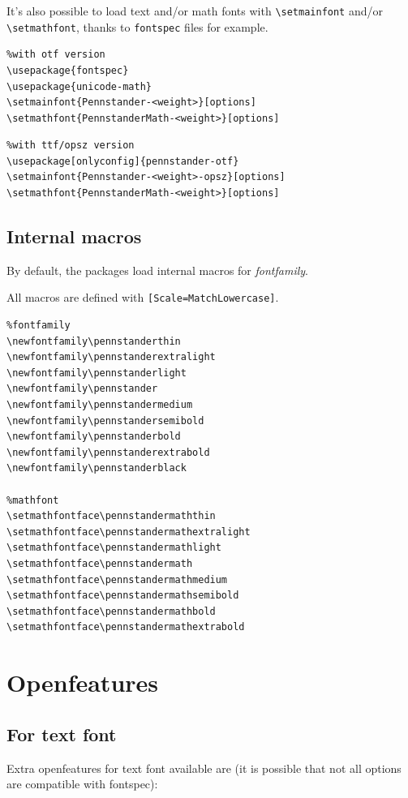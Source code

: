 \documentclass[a4paper]{scrartcl}
\newcommand*{\opt}[1]{\texttt{#1}}
\newcommand*{\cmd}[1]{\texttt{\textbackslash #1}}\newcommand*{\showtchar}[1]{\cmd{#1}~\csname #1\endcsname}
\begin{document}
It's also possible to load text and/or math fonts with \cmd{setmainfont} and/or \cmd{setmathfont}, thanks to \opt{fontspec} files for example.

\begin{verbatim}
%with otf version
\usepackage{fontspec}
\usepackage{unicode-math}
\setmainfont{Pennstander-<weight>}[options]
\setmathfont{PennstanderMath-<weight>}[options]
\end{verbatim}

\begin{verbatim}
%with ttf/opsz version
\usepackage[onlyconfig]{pennstander-otf}
\setmainfont{Pennstander-<weight>-opsz}[options]
\setmathfont{PennstanderMath-<weight>}[options]
\end{verbatim}

\subsection{Internal macros}

By default, the packages load internal macros for \textit{fontfamily}.

All macros are defined with \opt{[Scale=MatchLowercase]}.

\begin{verbatim}
%fontfamily
\newfontfamily\pennstanderthin
\newfontfamily\pennstanderextralight
\newfontfamily\pennstanderlight
\newfontfamily\pennstander
\newfontfamily\pennstandermedium
\newfontfamily\pennstandersemibold
\newfontfamily\pennstanderbold
\newfontfamily\pennstanderextrabold
\newfontfamily\pennstanderblack

%mathfont
\setmathfontface\pennstandermaththin
\setmathfontface\pennstandermathextralight
\setmathfontface\pennstandermathlight
\setmathfontface\pennstandermath
\setmathfontface\pennstandermathmedium
\setmathfontface\pennstandermathsemibold
\setmathfontface\pennstandermathbold
\setmathfontface\pennstandermathextrabold
\end{verbatim}

\pagebreak

\section{Openfeatures}

\subsection{For text font}

Extra openfeatures for text font available are (it is possible that not all options are compatible with fontspec):
\end{document}
